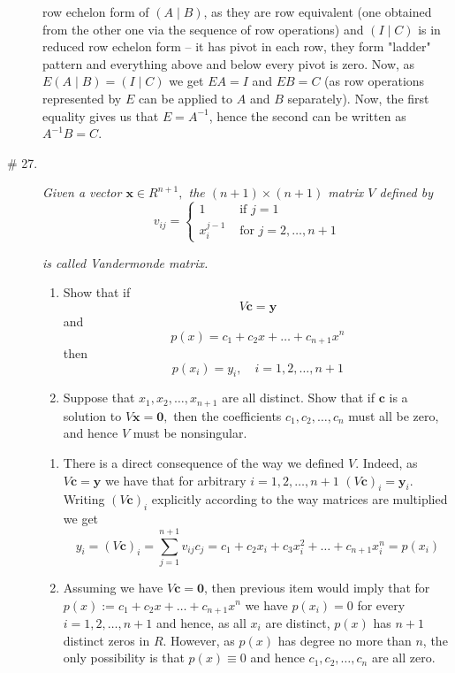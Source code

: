 \documentclass[8pt]{article} %
\begin{document}
\begin{description}
{		row echelon form of $(A\mid B)$, as they are row equivalent (one obtained from the other one via the sequence of row operations)
		and $(I\mid C)$ is in reduced row echelon form -- it has pivot in each row, they form "ladder" pattern and everything above and
		below every pivot is zero. Now, as $E(A\mid B)=(I\mid C)$ we get $EA=I$ and $EB=C$ (as row operations represented by $E$ can
		be applied to $A$ and $B$ separately). Now, the first equality gives us that $E=A^{-1}$, hence the second can be written as
		$A^{-1}B=C$.
		}
	\item[\# 27.]{
		\newcommand{\x}{\mathbf{x}}
		\renewcommand{\c}{\mathbf{c}}
		\newcommand{\y}{\mathbf{y}}
		\newcommand{\z}{\mathbf{0}}
		{\it Given a vector $\x\in R^{n+1},$ the $(n+1)\times (n+1)$ matrix $V$ defined by}
		\[v_{ij}=\begin{cases}1 & \mbox{ if }j=1\\x_i^{j-1} & \mbox{ for } j=2,\dots,n+1\end{cases}\]
		{\it is called Vandermonde matrix.
		\begin{enumerate}[label=(\alph*)]
			\item Show that if \[V\c=\y\] and \[p(x)=c_1+c_2x+\dots+c_{n+1}x^n\] then \[p(x_i)=y_i,\quad i=1,2,\dots,n+1\]
			\item Suppose that $x_1,x_2,\dots,x_{n+1}$ are all distinct. Show that if $\c$ is a solution to $V\x=\z,$ then the
				coefficients $c_1,c_2,\dots,c_n$ must all be zero, and hence $V$ must be nonsingular.
		\end{enumerate}
		}
		\begin{enumerate}[label=(\alph*)]
			\item There is a direct consequence of the way we defined $V$. Indeed, as $V\c=\y$ we have that for arbitrary $i=1,2,\dots,
				n+1$ $(V\c)_i=\y_i$. Writing $(V\c)_i$ explicitly according to the way matrices are multiplied we get
				\[y_i=(V\c)_i=\sum_{j=1}^{n+1}v_{ij}c_j=c_1+c_2x_i+c_3x_i^2+\dots+c_{n+1}x_i^n=p(x_i)\]
			\item Assuming we have $V\c=\z$, then previous item would imply that for $p(x):=c_1+c_2x+\dots+c_{n+1}x^n$ we have
				$p(x_i)=0$ for every $i=1,2,\dots,n+1$ and hence, as all $x_i$ are distinct, $p(x)$ has $n+1$ distinct zeros
				in $R$. However, as $p(x)$ has degree no more than $n$, the only possibility is that $p(x)\equiv 0$ and hence
				$c_1,c_2,\dots,c_n$ are all zero.
		\end{enumerate}
		}
	\end{description}
\end{document}
